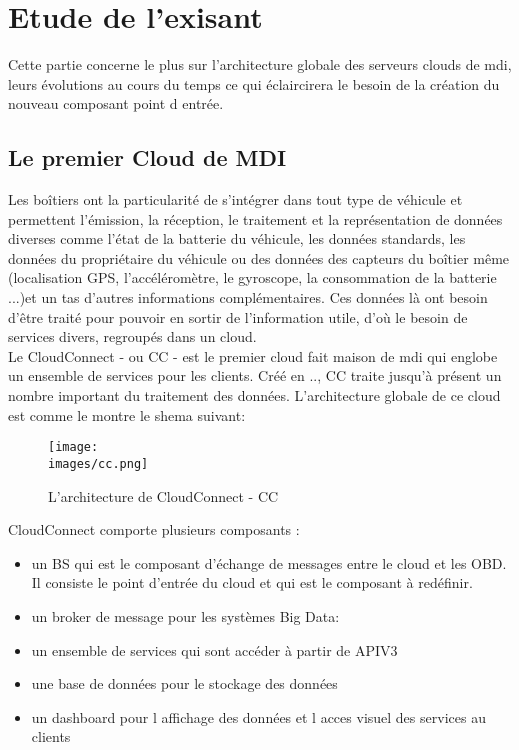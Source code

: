 \section{Etude de l'exisant}
   Cette partie concerne le plus sur l'architecture globale des serveurs clouds de \gls{mdi}, leurs évolutions 
   au cours du temps ce qui éclaircirera le besoin de la création du nouveau composant 
   point d entrée.  

    \subsection{Le premier Cloud de MDI}
        Les boîtiers ont la particularité de s’intégrer dans tout type de véhicule et permettent
       l’émission, la réception, le traitement et la représentation de données diverses comme
       l'état de la batterie du véhicule, les données standards, les données du propriétaire du
       véhicule ou des données des capteurs du boîtier même (localisation GPS,
       l’accéléromètre, le gyroscope, la consommation de la batterie ...)et un tas d'autres informations complémentaires.
       Ces données là ont besoin d'être traité pour pouvoir en sortir de l'information utile, d'où le besoin de services divers, regroupés 
       dans un cloud. \\ [0.3cm]
    
         Le CloudConnect - ou \gls{CC} - est le premier cloud fait maison de \gls{mdi} qui englobe un ensemble 
        de services pour les clients. Créé en .., \gls{CC} traite 
        jusqu'à présent un nombre important du traitement des données.
        L'architecture globale de ce cloud est comme le montre  le shema suivant: 

        \begin{figure}[ht]
            \centering
            \texttt{[image: \\images/cc.png]}
            \caption{L'architecture de CloudConnect - \gls{CC}}
        \end{figure}

        CloudConnect comporte plusieurs composants : 
        \begin{itemize}
            \renewcommand{\labelitemi}{$\bullet$}
            \item  un \gls{BS} qui est le composant d'échange de messages entre le cloud et 
            les OBD. Il consiste le point d'entrée du cloud et qui est le composant à redéfinir.
            \item  un broker de message pour les systèmes Big Data: 
            \item  un ensemble de services qui sont accéder à partir de APIV3 
            \item une base de données pour le stockage des données 
            \item un dashboard pour l affichage des données et l acces visuel 
            des services au clients 
        \end{itemize}
        \vspace{0.2cm}

